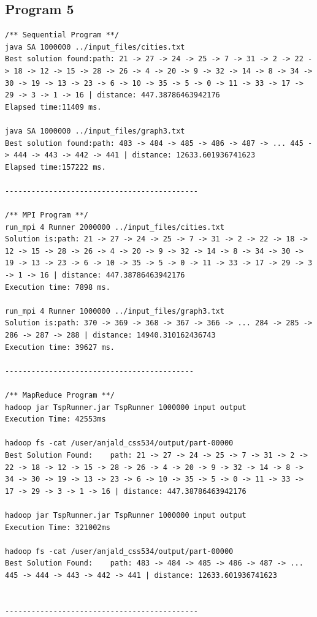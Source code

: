 \documentclass{article}
\begin{document}
		\subsection{Program 5} \label{P5_OUT}		
			\begin{lstlisting}
/** Sequential Program **/
java SA 1000000 ../input_files/cities.txt
Best solution found:path: 21 -> 27 -> 24 -> 25 -> 7 -> 31 -> 2 -> 22 -> 18 -> 12 -> 15 -> 28 -> 26 -> 4 -> 20 -> 9 -> 32 -> 14 -> 8 -> 34 -> 30 -> 19 -> 13 -> 23 -> 6 -> 10 -> 35 -> 5 -> 0 -> 11 -> 33 -> 17 -> 29 -> 3 -> 1 -> 16 | distance: 447.38786463942176
Elapsed time:11409 ms.

java SA 1000000 ../input_files/graph3.txt
Best solution found:path: 483 -> 484 -> 485 -> 486 -> 487 -> ... 445 -> 444 -> 443 -> 442 -> 441 | distance: 12633.601936741623
Elapsed time:157222 ms.

--------------------------------------------

/** MPI Program **/
run_mpi 4 Runner 2000000 ../input_files/cities.txt
Solution is:path: 21 -> 27 -> 24 -> 25 -> 7 -> 31 -> 2 -> 22 -> 18 -> 12 -> 15 -> 28 -> 26 -> 4 -> 20 -> 9 -> 32 -> 14 -> 8 -> 34 -> 30 -> 19 -> 13 -> 23 -> 6 -> 10 -> 35 -> 5 -> 0 -> 11 -> 33 -> 17 -> 29 -> 3 -> 1 -> 16 | distance: 447.38786463942176
Execution time: 7898 ms.

run_mpi 4 Runner 1000000 ../input_files/graph3.txt
Solution is:path: 370 -> 369 -> 368 -> 367 -> 366 -> ... 284 -> 285 -> 286 -> 287 -> 288 | distance: 14940.310162436743
Execution time: 39627 ms.

-------------------------------------------

/** MapReduce Program **/
hadoop jar TspRunner.jar TspRunner 1000000 input output
Execution Time: 42553ms

hadoop fs -cat /user/anjald_css534/output/part-00000
Best Solution Found:    path: 21 -> 27 -> 24 -> 25 -> 7 -> 31 -> 2 -> 22 -> 18 -> 12 -> 15 -> 28 -> 26 -> 4 -> 20 -> 9 -> 32 -> 14 -> 8 -> 34 -> 30 -> 19 -> 13 -> 23 -> 6 -> 10 -> 35 -> 5 -> 0 -> 11 -> 33 -> 17 -> 29 -> 3 -> 1 -> 16 | distance: 447.38786463942176

hadoop jar TspRunner.jar TspRunner 1000000 input output
Execution Time: 321002ms

hadoop fs -cat /user/anjald_css534/output/part-00000
Best Solution Found:	path: 483 -> 484 -> 485 -> 486 -> 487 -> ... 445 -> 444 -> 443 -> 442 -> 441 | distance: 12633.601936741623


--------------------------------------------


\end{lstlisting}
\end{document}
